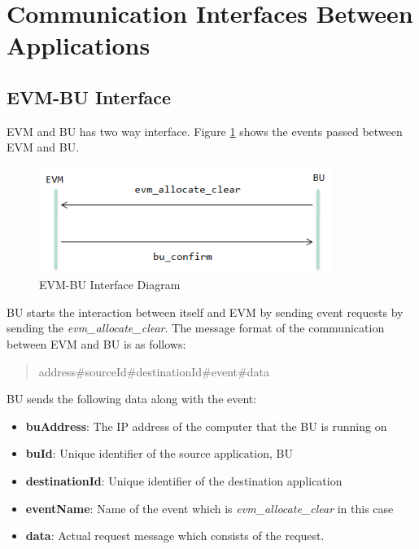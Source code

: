 \section{Communication Interfaces Between Applications}

\subsection{EVM-BU Interface}

EVM and BU has two way interface. Figure \ref{fig:evm-bu} shows the events passed between EVM and BU.
\begin{figure}
	\centering
		\includegraphics[width=0.85\textwidth]{figures/evm-bu.png}
	\caption{EVM-BU Interface Diagram}
	\label{fig:evm-bu}
\end{figure}

BU starts the interaction between itself and EVM by sending event requests by sending the \textit{evm\_allocate\_clear}. The message format of the communication between EVM and BU is as follows: 
\begin{quote}
	address\#sourceId\#destinationId\#event\#data
\end{quote}

BU sends the following data along with the event:

\begin{itemize}
	\item \textbf{buAddress}: The IP address of the computer that the BU is running on
	\item \textbf{buId}: Unique identifier of the source application, BU
	\item \textbf{destinationId}: Unique identifier of the destination application
	\item \textbf{eventName}: Name of the event which is \textit{evm\_allocate\_clear} in this case
	\item \textbf{data}: Actual request message which consists of the request.
\end{itemize}

